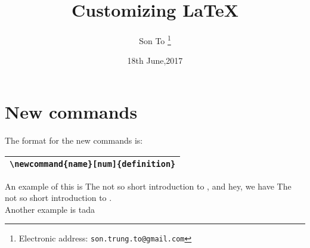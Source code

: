 \documentclass[a4paper,11pt]{article}
\newcommand{\tnss}{%
  The not so short introduction to \LaTeXe%
}
\begin{document}
\title{Customizing \LaTeX}
\author{Son To
  \thanks{Electronic address: \texttt{son.trung.to@gmail.com}}}
\date{18th June,2017}

  \maketitle
  \tableofcontents

\section{New commands}
The format for the new commands is:
\vskip 20pt
\begin{tabular}{|l|}
\hline
  \verb+\newcommand{name}[num]{definition}+ \\
\hline
\end{tabular}
\vskip 20pt
\flushleft
An example of this is \tnss, and hey, we have \tnss.\\
Another example is tada
\end{document}
